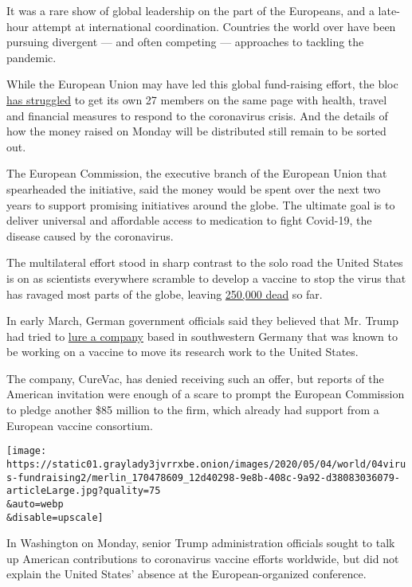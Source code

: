 It was a rare show of global leadership on the part of the Europeans,
and a late-hour attempt at international coordination. Countries the
world over have been pursuing divergent --- and often competing ---
approaches to tackling the pandemic.

While the European Union may have led this global fund-raising effort,
the bloc
\href{https://www.nytimes3xbfgragh.onion/2020/04/23/world/europe/coronavirus-eu-economic-recovery.html}{has
struggled} to get its own 27 members on the same page with health,
travel and financial measures to respond to the coronavirus crisis. And
the details of how the money raised on Monday will be distributed still
remain to be sorted out.

The European Commission, the executive branch of the European Union that
spearheaded the initiative, said the money would be spent over the next
two years to support promising initiatives around the globe. The
ultimate goal is to deliver universal and affordable access to
medication to fight Covid-19, the disease caused by the coronavirus.

The multilateral effort stood in sharp contrast to the solo road the
United States is on as scientists everywhere scramble to develop a
vaccine to stop the virus that has ravaged most parts of the globe,
leaving
\href{https://www.nytimes3xbfgragh.onion/interactive/2020/world/coronavirus-maps.html}{250,000
dead} so far.

In early March, German government officials said they believed that Mr.
Trump had tried to
\href{https://www.nytimes3xbfgragh.onion/2020/03/15/world/europe/cornonavirus-vaccine-us-germany.html}{lure
a company} based in southwestern Germany that was known to be working on
a vaccine to move its research work to the United States.

The company, CureVac, has denied receiving such an offer, but reports of
the American invitation were enough of a scare to prompt the European
Commission to pledge another \$85 million to the firm, which already had
support from a European vaccine consortium.

\texttt{[image: https://static01.graylady3jvrrxbe.onion/images/2020/05/04/world/04virus-fundraising2/merlin\_170478609\_12d40298-9e8b-408c-9a92-d38083036079-articleLarge.jpg?quality=75\\\&auto=webp\\\&disable=upscale]}

In Washington on Monday, senior Trump administration officials sought to
talk up American contributions to coronavirus vaccine efforts worldwide,
but did not explain the United States' absence at the European-organized
conference.

